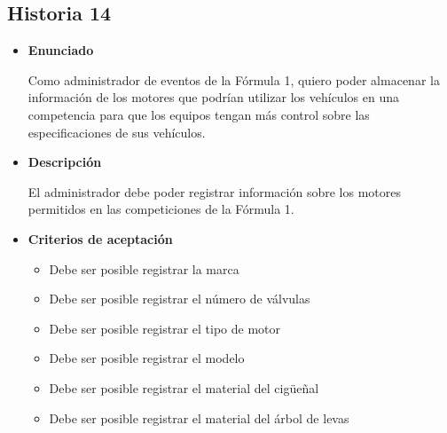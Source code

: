 \documentclass{article}
\begin{document}
	\subsection{Historia 14}
	\begin{itemize}
		
		\item \large{\textbf{Enunciado}}
		\begin{description}
Como administrador de eventos de la Fórmula 1, quiero poder almacenar la información de los motores que podrían utilizar los vehículos en una competencia para que los equipos tengan más control sobre las especificaciones de sus vehículos.

		\end{description}
		
		\item \large{\textbf{Descripción}}
		\begin{description}
El administrador debe poder registrar información sobre los motores permitidos en las competiciones de la Fórmula 1. 

		\end{description}
		
		\item \large{\textbf{Criterios de aceptación}}
		\begin{itemize}
			\item Debe ser posible registrar la marca
			\item Debe ser posible registrar el número de válvulas
			\item Debe ser posible registrar el tipo de motor
			\item Debe ser posible registrar el modelo
			\item Debe ser posible registrar el material del cigüeñal
			\item Debe ser posible registrar el material del árbol de levas
			
		\end{itemize}
		
	\end{itemize}
	
\end{document}
